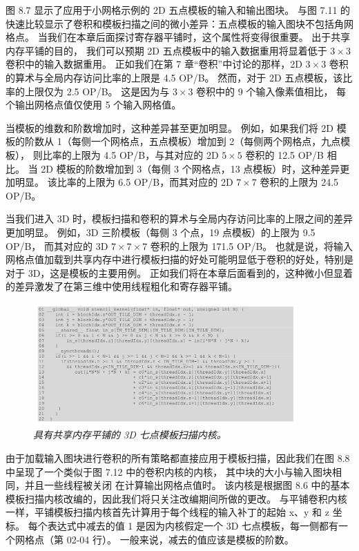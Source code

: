 图 8.7 显示了应用于小网格示例的 2D 五点模板的输入和输出图块。 
与图 7.11 的快速比较显示了卷积和模板扫描之间的微小差异：五点模板的输入图块不包括角网格点。 
当我们在本章后面探讨寄存器平铺时，这个属性将变得很重要。 出于共享内存平铺的目的，
我们可以预期 2D 五点模板中的输入数据重用将显着低于 $3 \times 3$ 卷积中的输入数据重用。 
正如我们在第 7 章“卷积”中讨论的那样，2D $3 \times 3$ 卷积的算术与全局内存访问比率的上限是 4.5 OP/B。 
然而，对于 2D 五点模板，该比率的上限仅为 2.5 OP/B。 这是因为与 $3 \times 3$ 卷积中的 9 个输入像素值相比，
每个输出网格点值仅使用 5 个输入网格值。

当模板的维数和阶数增加时，这种差异甚至更加明显。 
例如，如果我们将 2D 模板的阶数从 1（每侧一个网格点，五点模板）增加到 2（每侧两个网格点，九点模板），
则比率的上限为 4.5 OP/B，与其对应的 2D $5 \times 5$ 卷积的 12.5 OP/B 相比。 
当 2D 模板的阶数增加到 3（每侧 3 个网格点，13 点模板）时，这种差异更加明显。 
该比率的上限为 6.5 OP/B，而其对应的 2D $7 \times 7$ 卷积的上限为 24.5 OP/B。

当我们进入 3D 时，模板扫描和卷积的算术与全局内存访问比率的上限之间的差异更加明显。 
例如，3D 三阶模板（每侧 3 个点，19 点模板）的上限为 9.5 OP/B，
而其对应的 3D $7 \times 7 \times 7$ 卷积的上限为 171.5 OP/B。 
也就是说，将输入网格点值加载到共享内存中进行模板扫描的好处可能明显低于卷积的好处，特别是对于 3D，这是模板的主要用例。 
正如我们将在本章后面看到的，这种微小但显着的差异激发了在第三维中使用线程粗化和寄存器平铺。

\begin{figure}[H]
	\centering
	\includegraphics[width=0.9\textwidth]{figs/F8.8.png}
	\caption{\textit{具有共享内存平铺的 3D 七点模板扫描内核。}}
\end{figure}

由于加载输入图块进行卷积的所有策略都直接应用于模板扫描，因此我们在图 8.8 中呈现了一个类似于图 7.12 中的卷积内核的内核，
其中块的大小与输入图块相同，并且一些线程被关闭 在计算输出网格点值时。 
该内核是根据图 8.6 中的基本模板扫描内核改编的，因此我们将只关注改编期间所做的更改。 
与平铺卷积内核一样，平铺模板扫描内核首先计算用于每个线程的输入补丁的起始 x、y 和 z 坐标。 
每个表达式中减去的值 1 是因为内核假定一个 3D 七点模板，每一侧都有一个网格点（第 02-04 行）。 
一般来说，减去的值应该是模板的阶数。


